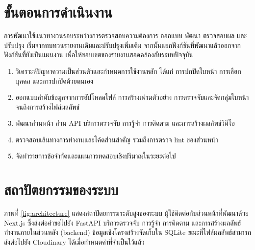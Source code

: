 \section{ขั้นตอนการดำเนินงาน}

การพัฒนาใช้แนวทางวนรอบระหว่างการตรวจสอบความต้องการ ออกแบบ พัฒนา ตรวจสอบผล และปรับปรุง เริ่มจากทบทวนรายงานเดิมและปรับปรุงเพิ่มเติม จากนั้นแยกฟังก์ชันที่พัฒนาแล้วออกจากฟังก์ชันที่ยังเป็นแผนงาน เพื่อให้ขอบเขตของรายงานสอดคล้องกับระบบปัจจุบัน

\begin{enumerate}
    \item วิเคราะห์ปัญหาความเป็นส่วนตัวและกำหนดการใช้งานหลัก ได้แก่ การปกปิดใบหน้า การเลือกบุคคล และการปกปิดด้วยตนเอง
    \item ออกแบบลำดับข้อมูลจากการอัปโหลดไฟล์ การสร้างเฟรมตัวอย่าง การตรวจจับและจัดกลุ่มใบหน้า จนถึงการสร้างไฟล์ผลลัพธ์
    \item พัฒนาส่วนหน้า ส่วน API บริการตรวจจับ การรู้จำ การติดตาม และการสร้างผลลัพธ์วิดีโอ
    \item ตรวจสอบเส้นทางการทำงานและโค้ดส่วนสำคัญ รวมถึงการตรวจ lint ของส่วนหน้า
    \item จัดทำรายการข้อจำกัดและแผนการทดสอบเชิงปริมาณในระยะต่อไป
\end{enumerate}

\section{สถาปัตยกรรมของระบบ}

ภาพที่ \ref{fig:architecture} แสดงสถาปัตยกรรมระดับสูงของระบบ ผู้ใช้ติดต่อกับส่วนหน้าที่พัฒนาด้วย Next.js ซึ่งส่งต่อคำขอไปยัง FastAPI บริการตรวจจับ การรู้จำ การติดตาม และการสร้างผลลัพธ์ทำงานภายในส่วนหลัง (backend) ข้อมูลเชิงโครงสร้างจัดเก็บใน SQLite ขณะที่ไฟล์ผลลัพธ์สามารถส่งต่อไปยัง Cloudinary ได้เมื่อกำหนดค่าที่จำเป็นไว้แล้ว

